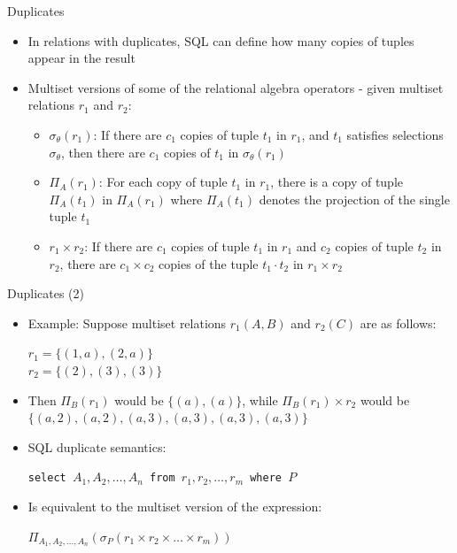 \documentclass[aspectratio=169, xcolor=dvipsnames]{beamer}
\begin{document}
\begin{frame}{Duplicates}
    \begin{itemize}
        \item In relations with duplicates, SQL can define how many copies of tuples appear in the result
        \item Multiset versions of some of the relational algebra operators - given multiset relations $r_1$ and $r_2$:
        \begin{itemize}
            \item[a)] $\sigma_{\theta}(r_1)$: If there are $c_1$ copies of tuple $t_1$ in $r_1$, and $t_1$ satisfies selections $\sigma_{\theta}$, then there are $c_1$ copies of $t_1$ in $\sigma_{\theta}(r_1)$
            \item[b)] $\Pi_A(r_1)$: For each copy of tuple $t_1$ in $r_1$, there is a copy of tuple $\Pi_A(t_1)$ in $\Pi_A(r_1)$ where $\Pi_A(t_1)$ denotes the projection of the single tuple $t_1$
            \item[c)] $r_1 \times r_2$: If there are $c_1$ copies of tuple $t_1$ in $r_1$ and $c_2$ copies of tuple $t_2$ in $r_2$, there are $c_1 \times c_2$ copies of the tuple $t_1 \cdot t_2$ in $r_1 \times r_2$
        \end{itemize}
    \end{itemize}
\end{frame}

\begin{frame}{Duplicates (2)}
    \begin{itemize}
        \item Example: Suppose multiset relations $r_1(A, B)$ and $r_2(C)$ are as follows: 
        \begin{center}
            $r_1 = \{(1, a), (2, a)\}$ \\
            $r_2 = \{(2), (3), (3)\}$
        \end{center}
        \item Then $\Pi_B(r_1)$ would be $\{(a), (a)\}$, while $\Pi_B(r_1) \times r_2$ would be $\{(a, 2), (a, 2), (a, 3), (a, 3), (a, 3), (a, 3)\}$
        \item SQL duplicate semantics:
        \begin{center}
            \texttt{select $A_1, A_2, \dots, A_n$ \newline from $r_1, r_2, \dots, r_m$ \newline where $P$}
        \end{center}
        \item Is equivalent to the multiset version of the expression:
        \begin{center}
            $\Pi_{A_1, A_2, \dots, A_n} (\sigma_P (r_1 \times r_2 \times \dots \times r_m))$
        \end{center}
    \end{itemize}
\end{frame}
\end{document}
